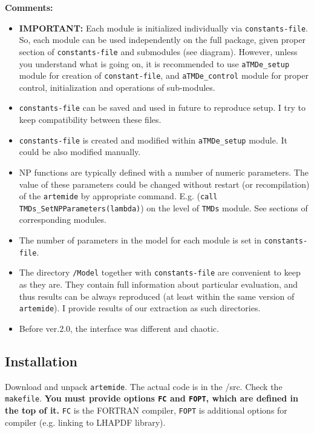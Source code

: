 \documentclass[prd,nofootinbib,eqsecnum,final]{revtex4}
\renewcommand{\(}{\left(}
\renewcommand{\)}{\right)}
\renewcommand{\[}{\left[}
\renewcommand{\]}{\right]}
\newcommand{\red}[1]{{\color[rgb]{1,0,0} #1}}
\begin{document}
\textbf{Comments:}
\begin{itemize}
\item \textbf{IMPORTANT:} Each module is initialized individually via \texttt{constants-file}. So, each module can be used independently on the full package, given proper section of \texttt{constants-file} and submodules (see diagram). However, unless you understand what is going on, it is recommended to use \texttt{aTMDe\_setup} module for  creation of \texttt{constant-file}, and \texttt{aTMDe\_control} module for proper control, initialization and operations of sub-modules.
\item \texttt{constants-file} can be saved and used in future to reproduce setup. I try to keep compatibility between these files.
\item \texttt{constants-file} is created and modified within \texttt{aTMDe\_setup} module. It could be also modified manually.
\item NP functions are typically defined with a number of numeric parameters. The value of these parameters could be changed without restart (or recompilation) of the \texttt{artemide} by appropriate command. E.g. (\texttt{call TMDs{\_}SetNPParameters(lambda)}) on the level of \texttt{TMDs} module. See sections of corresponding modules.
\item The number of parameters in the model for each module is set in \texttt{constants-file}.
\item The directory \texttt{/Model} together with \texttt{constants-file} are convenient to keep as they are. They contain full information about particular evaluation, and thus results can be always reproduced (at least within the same version of \texttt{artemide}). I provide results of our extraction as such directories. 
\item Before ver.2.0, the interface was different and chaotic.
\end{itemize}

\subsection{Installation}

Download and unpack \texttt{artemide}. The actual code is in the /src. Check the \texttt{makefile}. \red{\textbf{You must provide options \texttt{FC} and \texttt{FOPT}, which are defined in the top of it.}} \texttt{FC} is the FORTRAN compiler, \texttt{FOPT} is additional options for compiler (e.g. linking to LHAPDF library).
\end{document}

